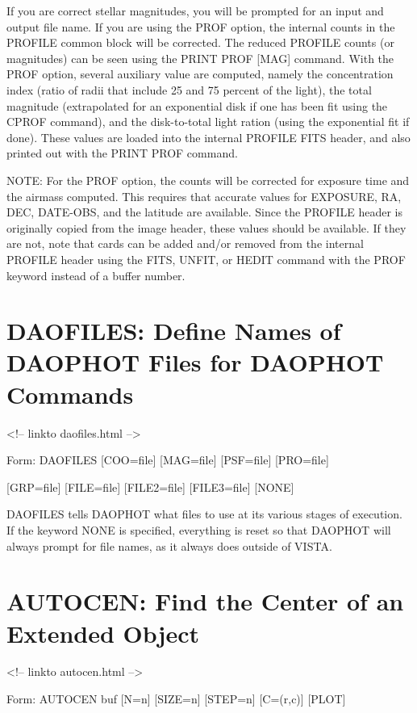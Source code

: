 If you are correct stellar magnitudes, you will be prompted for an input
and output file name.  If you are using the PROF option, the internal
counts in the PROFILE common block will be corrected.  The reduced PROFILE
counts (or magnitudes) can be seen using the PRINT PROF {[MAG]}
command. With the PROF option, several auxiliary value are computed, namely
the concentration index (ratio of radii that include 25 and 75 percent of
the light), the total magnitude (extrapolated for an exponential disk if
one has been fit using the CPROF command), and the disk-to-total light
ration (using the exponential fit if done). These values are loaded into
the internal PROFILE FITS header, and also printed out with the PRINT PROF
command.

NOTE: For the PROF option, the counts will be corrected for exposure time
and the airmass computed. This requires that accurate values for EXPOSURE,
RA, DEC, DATE-OBS, and the latitude are available. Since the PROFILE header
is originally copied from the image header, these values should be
available. If they are not, note that cards can be added and/or removed
from the internal PROFILE header using the FITS, UNFIT, or HEDIT command
with the PROF keyword instead of a buffer number.

\section{DAOFILES: Define Names of DAOPHOT Files for DAOPHOT Commands}
\begin{rawhtml}
<!-- linkto daofiles.html -->
\end{rawhtml}
\begin{command}
  \item[Form: DAOFILES {[COO=file]} {[MAG=file]} {[PSF=file]} {[PRO=file]}\hfill]{}
  \item{{[GRP=file]} {[FILE=file]} {[FILE2=file]} {[FILE3=file]} {[NONE]}}
\end{command}

DAOFILES tells DAOPHOT what files to use at its various stages of
execution. If the keyword NONE is specified, everything is reset so that
DAOPHOT will always prompt for file names, as it always does outside of
VISTA.

\section{AUTOCEN: Find the Center of an Extended Object}
\begin{rawhtml}
<!-- linkto autocen.html -->
\end{rawhtml}
\begin{command}
  \item[Form: AUTOCEN buf {[N=n]} {[SIZE=n]} {[STEP=n]} {[C=(r,c)]} 
       {[PLOT]}\hfill]{}
\end{command}

